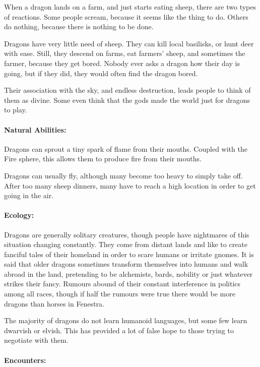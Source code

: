 \begin{multicols}{2}

\noindent
When a dragon lands on a farm, and just starts eating sheep, there are two types of reactions.
Some people scream, because it seems like the thing to do.
Others do nothing, because there is nothing to be done.

Dragons have very little need of sheep.
They can kill local basilisks, or hunt deer with ease.
Still, they descend on farms, eat farmers' sheep, and sometimes the farmer, because they get bored.
Nobody ever asks a dragon how their day is going, but if they did, they would often find the dragon bored.

Their association with the sky, and endless destruction, leads people to think of them as divine.
Some even think that the gods made the world just for dragons to play.

\paragraph{Natural Abilities:}
Dragons can sprout a tiny spark of flame from their mouths.
Coupled with the Fire sphere, this allows them to produce fire from their mouths.

Dragons can usually fly, although many become too heavy to simply take off.
After too many sheep dinners, many have to reach a high location in order to get going in the air.

\paragraph{Ecology:} Dragons are generally solitary creatures, though people have nightmares of this situation changing constantly.
They come from distant lands and like to create fanciful tales of their homeland in order to scare humans or irritate gnomes.
It is said that older dragons sometimes transform themselves into humans and walk abroad in the land, pretending to be alchemists, bards, nobility or just whatever strikes their fancy.
Rumours abound of their constant interference in politics among all races, though if half the rumours were true there would be more dragons than horses in Fenestra.

The majority of dragons do not learn humanoid languages, but some few learn dwarvish or elvish.
This has provided a lot of false hope to those trying to negotiate with them.

\paragraph{Encounters:}


\end{multicols}
